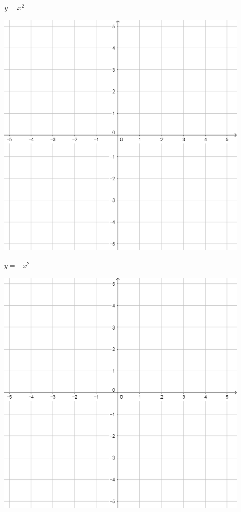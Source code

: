 \documentclass[a4paper]{oblivoir}
\begin{document}
\begin{minipage}{0.45\textwidth}\centering
\(y=x^2\)
\par\bigskip\includegraphics[width=0.9\textwidth]{55}
\end{minipage}
\begin{minipage}{0.45\textwidth}\centering
\(y=-x^2\)
\par\bigskip\includegraphics[width=0.9\textwidth]{55}
\end{minipage}\bigskip\bigskip\par
\end{document}
